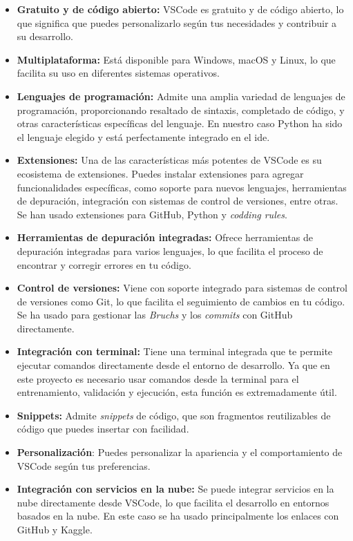 \begin{itemize}
    \item \textbf{Gratuito y de código abierto:} VSCode es gratuito y de código abierto, lo que significa que puedes personalizarlo según tus necesidades y contribuir a su desarrollo.

    \item \textbf{Multiplataforma:} Está disponible para Windows, macOS y Linux, lo que facilita su uso en diferentes sistemas operativos.

    \item \textbf{Lenguajes de programación:} Admite una amplia variedad de lenguajes de programación, proporcionando resaltado de sintaxis, completado de código, y otras características específicas del lenguaje. En nuestro caso Python ha sido el lenguaje elegido y está perfectamente integrado en el \acrshort{ide}.

    \item \textbf{Extensiones:} Una de las características más potentes de VSCode es su ecosistema de extensiones. Puedes instalar extensiones para agregar funcionalidades específicas, como soporte para nuevos lenguajes, herramientas de depuración, integración con sistemas de control de versiones, entre otras. Se han usado extensiones para GitHub, Python y \textit{codding rules}.

    \item \textbf{Herramientas de depuración integradas:} Ofrece herramientas de depuración integradas para varios lenguajes, lo que facilita el proceso de encontrar y corregir errores en tu código.

    \item \textbf{Control de versiones:} Viene con soporte integrado para sistemas de control de versiones como Git, lo que facilita el seguimiento de cambios en tu código. Se ha usado para gestionar las \textit{Bruchs} y los \textit{commits} con GitHub directamente.

    \item \textbf{Integración con terminal:} Tiene una terminal integrada que te permite ejecutar comandos directamente desde el entorno de desarrollo. Ya que en este proyecto es necesario usar comandos desde la terminal para el entrenamiento, validación y ejecución, esta función es extremadamente útil.

    \item \textbf{Snippets:} Admite \textit{snippets} de código, que son fragmentos reutilizables de código que puedes insertar con facilidad.

    \item \textbf{Personalización}: Puedes personalizar la apariencia y el comportamiento de VSCode según tus preferencias.

    \item \textbf{Integración con servicios en la nube:} Se puede integrar servicios en la nube directamente desde VSCode, lo que facilita el desarrollo en entornos basados en la nube. En este caso se ha usado principalmente los enlaces con GitHub y Kaggle.
\end{itemize}

